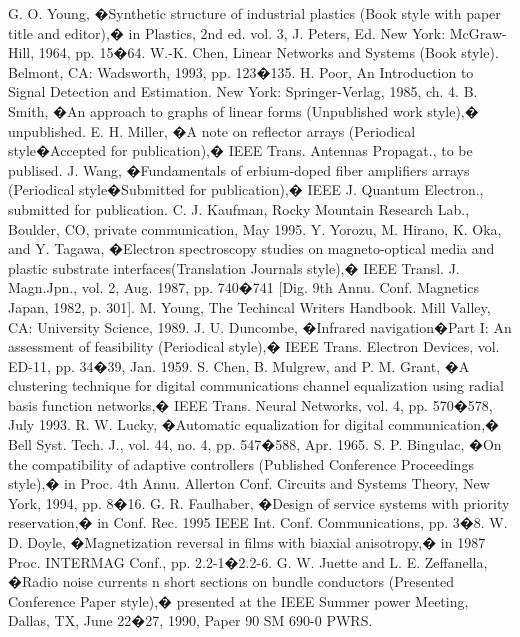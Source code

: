 \documentclass[letterpaper, 10 pt, conference]{ieeeconf}  %
\begin{document}
\begin{thebibliography}{99}

 G. O. Young, �Synthetic structure of industrial plastics (Book style with paper title and editor),� 	in Plastics, 2nd ed. vol. 3, J. Peters, Ed.  New York: McGraw-Hill, 1964, pp. 15�64.
 W.-K. Chen, Linear Networks and Systems (Book style).	Belmont, CA: Wadsworth, 1993, pp. 123�135.
 H. Poor, An Introduction to Signal Detection and Estimation.   New York: Springer-Verlag, 1985, ch. 4.
 B. Smith, �An approach to graphs of linear forms (Unpublished work style),� unpublished.
 E. H. Miller, �A note on reflector arrays (Periodical style�Accepted for publication),� IEEE Trans. Antennas Propagat., to be publised.
 J. Wang, �Fundamentals of erbium-doped fiber amplifiers arrays (Periodical style�Submitted for publication),� IEEE J. Quantum Electron., submitted for publication.
 C. J. Kaufman, Rocky Mountain Research Lab., Boulder, CO, private communication, May 1995.
 Y. Yorozu, M. Hirano, K. Oka, and Y. Tagawa, �Electron spectroscopy studies on magneto-optical media and plastic substrate interfaces(Translation Journals style),� IEEE Transl. J. Magn.Jpn., vol. 2, Aug. 1987, pp. 740�741 [Dig. 9th Annu. Conf. Magnetics Japan, 1982, p. 301].
 M. Young, The Techincal Writers Handbook.  Mill Valley, CA: University Science, 1989.
 J. U. Duncombe, �Infrared navigation�Part I: An assessment of feasibility (Periodical style),� IEEE Trans. Electron Devices, vol. ED-11, pp. 34�39, Jan. 1959.
 S. Chen, B. Mulgrew, and P. M. Grant, �A clustering technique for digital communications channel equalization using radial basis function networks,� IEEE Trans. Neural Networks, vol. 4, pp. 570�578, July 1993.
 R. W. Lucky, �Automatic equalization for digital communication,� Bell Syst. Tech. J., vol. 44, no. 4, pp. 547�588, Apr. 1965.
 S. P. Bingulac, �On the compatibility of adaptive controllers (Published Conference Proceedings style),� in Proc. 4th Annu. Allerton Conf. Circuits and Systems Theory, New York, 1994, pp. 8�16.
 G. R. Faulhaber, �Design of service systems with priority reservation,� in Conf. Rec. 1995 IEEE Int. Conf. Communications, pp. 3�8.
 W. D. Doyle, �Magnetization reversal in films with biaxial anisotropy,� in 1987 Proc. INTERMAG Conf., pp. 2.2-1�2.2-6.
 G. W. Juette and L. E. Zeffanella, �Radio noise currents n short sections on bundle conductors (Presented Conference Paper style),� presented at the IEEE Summer power Meeting, Dallas, TX, June 22�27, 1990, Paper 90 SM 690-0 PWRS.

\end{thebibliography}
\end{document}
